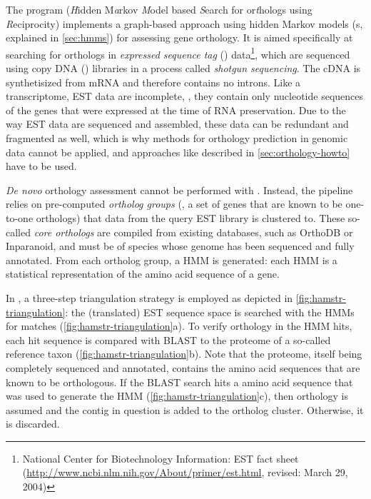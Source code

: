 \label{sec:hamstr}
The program \hamstr (\emph{H}idden M\emph{a}rkov \emph{M}odel based
\emph{S}earch for or\emph{t}hologs using \emph{R}eciprocity) implements a
graph-based approach using hidden Markov models (s, explained in \autoref{sec:hmms}) for assessing gene orthology.
It is aimed specifically at searching for orthologs in \emph{expressed sequence
tag} () data\footnote{National Center
for Biotechnology Information: EST fact sheet
(\url{http://www.ncbi.nlm.nih.gov/About/primer/est.html}, revised: March 29,
2004)}, which are sequenced using copy DNA ()
libraries in a process called \emph{shotgun sequencing}. The cDNA is
synthetisized from mRNA and therefore contains no introns. Like a transcriptome,
EST data are incomplete, \ie, they contain only nucleotide sequences of the
genes that were expressed at the time of RNA preservation. Due to the way EST
data are sequenced and assembled, these data can be redundant and fragmented as
well, which is why methods for orthology prediction in genomic data cannot be
applied, and approaches like described in \autoref{sec:orthology-howto} have to
be used.

\emph{De novo} orthology assessment cannot be performed with \hamstr. Instead,
the pipeline relies on pre-computed \emph{ortholog groups}
(, a set of genes
that are known to be one-to-one orthologs) that data from the query EST library
is clustered to. These so-called \emph{core orthologs} are compiled from
existing databases, such as OrthoDB or Inparanoid, and must be of species 
whose genome has been sequenced and fully annotated.
From each ortholog group, a HMM is generated: each HMM is a statistical
representation of the amino acid sequence of a gene. 

In \hamstr, a three-step triangulation strategy is employed as depicted in
\autoref{fig:hamstr-triangulation}: the (translated) EST sequence space is
searched with the HMMs for matches (\autoref{fig:hamstr-triangulation}a). To
verify orthology in the HMM hits, each hit sequence is compared with BLAST
\citep{altschul1997} to the proteome of a so-called reference taxon
(\autoref{fig:hamstr-triangulation}b). Note that the proteome, itself being
completely sequenced and annotated, contains the amino acid sequences that are
known to be orthologous. If the BLAST search hits a amino acid sequence that was
used to generate the HMM (\autoref{fig:hamstr-triangulation}c), then orthology
is assumed and the contig in question is added to the ortholog cluster.
Otherwise, it is discarded.

